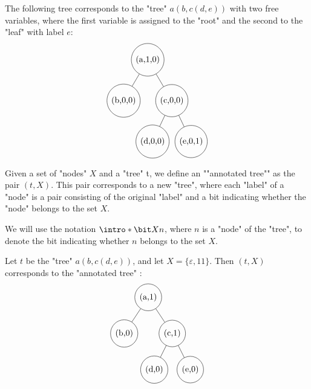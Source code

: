 \documentclass[a4paper,UKenglish,cleveref, autoref, thm-restate]{lipics-v2021}
\begin{document}
\begin{example}
	The following tree corresponds to the "tree" $a(b,c(d,e))$ with two free variables, where the first variable is assigned to the "root" and the second to the "leaf"
	with label $e$:
	\[
		\begin{tikzpicture}[level distance=1.7cm,
				every node/.style={draw, circle, minimum size=5mm},
				level 1/.style={sibling distance=2cm},
				level 2/.style={sibling distance=1.6cm}]
			\node {(a,1,0)}
			child { node {(b,0,0)}}
			child { node {(c,0,0)}
					child {node {(d,0,0)}}
					child {node {(e,0,1)}} };
		\end{tikzpicture}
	\]

\end{example}

\begin{definition}
	Given a set of "nodes" $X$ and a "tree" t, we define an ""annotated tree"" as the pair $(t, X)$. This pair
	corresponds to a new "tree", where each "label" of a "node" is a pair consisting of the original "label" and a bit indicating whether the "node" belongs to the set $X$.

	We will use the notation $\intro*\bit X n $, where $n$ is a "node" of the "tree", to denote the bit indicating whether $n$ belongs to the set $X$.
\end{definition}

\begin{example}
	Let $t$ be the "tree" $a(b,c(d,e))$, and let $X = \{\varepsilon,11\}$.
	Then $(t, X)$ corresponds to the "annotated tree" :
	\[
		\begin{tikzpicture}[level distance=1.5cm,
				every node/.style={draw, circle, minimum size=5mm},
				level 1/.style={sibling distance=2cm},
				level 2/.style={sibling distance=1.5cm}]
			\node {(a,1)}
			child { node {(b,0)}}
			child { node {(c,1)}
					child {node {(d,0)}}
					child {node {(e,0)}} };
		\end{tikzpicture}
	\]
\end{example}



\end{document}
